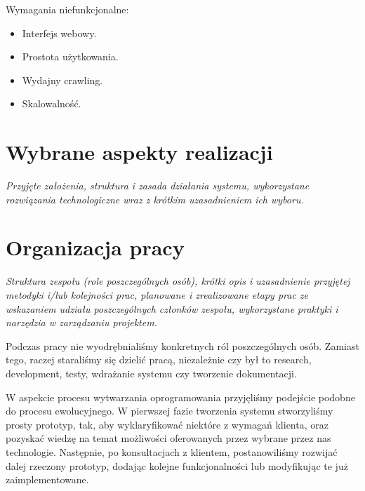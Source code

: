 \documentclass[polish,12pt]{aghthesis}
\begin{document}
Wymagania niefunkcjonalne:
\begin{itemize}
\item Interfejs webowy.
\item Prostota użytkowania.
\item Wydajny crawling.
\item Skalowalność.
\end{itemize}

\section{Wybrane aspekty realizacji}
\label{sec:wybrane-aspekty-realizacji}

\emph{Przyjęte założenia, struktura i zasada działania systemu,
  wykorzystane rozwiązania technologiczne wraz z krótkim uzasadnieniem
  ich wyboru.}

\section{Organizacja pracy}
\label{sec:organizacja-pracy}

\emph{Struktura zespołu (role poszczególnych osób), krótki opis i
  uzasadnienie przyjętej metodyki i/lub kolejności prac, planowane i
  zrealizowane etapy prac ze wskazaniem udziału poszczególnych
  członków zespołu, wykorzystane praktyki i narzędzia w zarządzaniu
  projektem.}

Podczas pracy nie wyodrębnialiśmy konkretnych ról poszczególnych osób. Zamiast tego, raczej staraliśmy się dzielić pracą, niezależnie czy
był to
research, development, testy, wdrażanie systemu czy tworzenie dokumentacji.

W aspekcie procesu wytwarzania oprogramowania przyjęliśmy podejście podobne do procesu ewolucyjnego. W pierwszej fazie tworzenia systemu 
stworzyliśmy prosty prototyp, tak, aby wyklaryfikować niektóre z wymagań klienta, oraz pozyskać wiedzę na temat możliwości oferowanych
przez wybrane przez nas technologie. Następnie, po konsultacjach z klientem, postanowiliśmy rozwijać dalej rzeczony prototyp, dodając 
kolejne funkcjonalności lub modyfikując te już zaimplementowane. 
\end{document}
